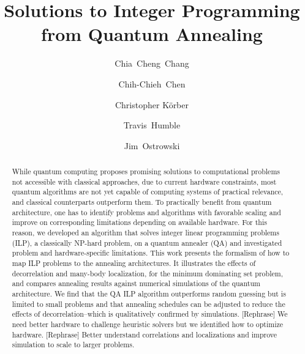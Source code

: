 \documentclass[prd,twocolumn,tightenlines,preprintnumbers,showpacs,superscriptaddress,notitlepage,nofootinbib,eqsecnum,floatfix,longbibliography]{revtex4}
\begin{document}
\title{Solutions to Integer Programming from Quantum Annealing}

\author{Chia~Cheng~Chang}
\author{Chih-Chieh~Chen}
\author{Christopher K\"orber}
\author{Travis~Humble}
\author{Jim~Ostrowski}

\newcommand{\alert}[1]{\textbf{\color{red}{#1}}}
\renewcommand{\vec}[1]{\boldsymbol{#1}}

\begin{abstract}
While quantum computing proposes promising solutions to computational problems not accessible with classical approaches, due to current hardware constraints, most quantum algorithms are not yet capable of computing systems of practical relevance, and classical counterparts outperform them.
To practically benefit from quantum architecture, one has to identify problems and algorithms with favorable scaling and improve on corresponding limitations depending on available hardware.
For this reason, we developed an algorithm that solves integer linear programming problems (ILP), a classically NP-hard problem, on a quantum annealer (QA) and investigated problem and hardware-specific limitations.
This work presents the formalism of how to map ILP problems to the annealing architectures.
It illustrates the effects of decorrelation and many-body localization, for the minimum dominating set problem, and compares annealing results against numerical simulations of the quantum architecture.
We find that the QA ILP algorithm outperforms random guessing but is limited to small problems and that annealing schedules can be adjusted to reduce the effects of decorrelation--which is qualitatively confirmed by simulations.
[Rephrase] We need better hardware to challenge heuristic solvers but we identified how to optimize hardware.
[Rephrase] Better understand correlations and localizations and improve simulation to scale to larger problems.

\end{abstract}
\end{document}
